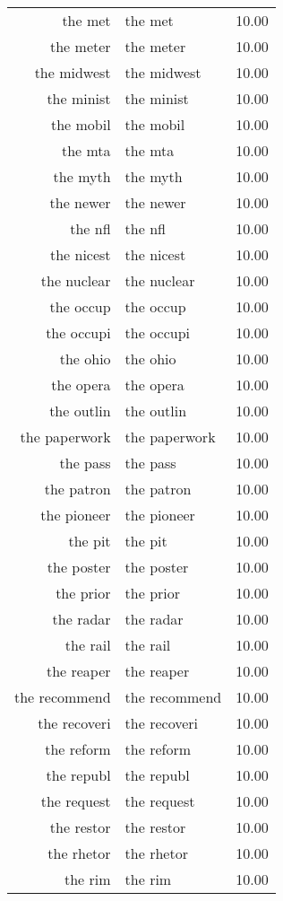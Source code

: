 \begin{table}[ht]
\begin{tabular}{rlr}
  the met & the met & 10.00 \\ 
  the meter & the meter & 10.00 \\ 
  the midwest & the midwest & 10.00 \\ 
  the minist & the minist & 10.00 \\ 
  the mobil & the mobil & 10.00 \\ 
  the mta & the mta & 10.00 \\ 
  the myth & the myth & 10.00 \\ 
  the newer & the newer & 10.00 \\ 
  the nfl & the nfl & 10.00 \\ 
  the nicest & the nicest & 10.00 \\ 
  the nuclear & the nuclear & 10.00 \\ 
  the occup & the occup & 10.00 \\ 
  the occupi & the occupi & 10.00 \\ 
  the ohio & the ohio & 10.00 \\ 
  the opera & the opera & 10.00 \\ 
  the outlin & the outlin & 10.00 \\ 
  the paperwork & the paperwork & 10.00 \\ 
  the pass & the pass & 10.00 \\ 
  the patron & the patron & 10.00 \\ 
  the pioneer & the pioneer & 10.00 \\ 
  the pit & the pit & 10.00 \\ 
  the poster & the poster & 10.00 \\ 
  the prior & the prior & 10.00 \\ 
  the radar & the radar & 10.00 \\ 
  the rail & the rail & 10.00 \\ 
  the reaper & the reaper & 10.00 \\ 
  the recommend & the recommend & 10.00 \\ 
  the recoveri & the recoveri & 10.00 \\ 
  the reform & the reform & 10.00 \\ 
  the republ & the republ & 10.00 \\ 
  the request & the request & 10.00 \\ 
  the restor & the restor & 10.00 \\ 
  the rhetor & the rhetor & 10.00 \\ 
  the rim & the rim & 10.00 \\ 

\end{tabular}
\end{table}
